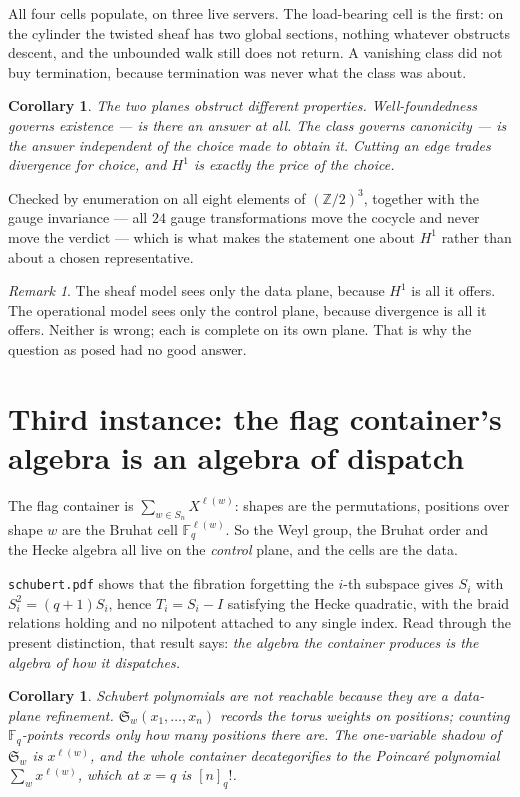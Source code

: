 \documentclass[11pt,a4paper]{article}
\newtheorem{corollary}[theorem]{Corollary}
\theoremstyle{definition}
\theoremstyle{remark}
\newtheorem{remark}[theorem]{Remark}
\newcommand{\FF}{\mathbb{F}}
\newcommand{\ZZ}{\mathbb{Z}}
\newcommand{\Schub}{\mathfrak{S}}
\begin{document}
All four cells populate, on three live servers. The load-bearing cell is the
first: on the cylinder the twisted sheaf has two global sections, nothing
whatever obstructs descent, and the unbounded walk still does not return. A
vanishing class did not buy termination, because termination was never what the
class was about.

\begin{corollary}
The two planes obstruct different properties. Well-foundedness governs
\emph{existence} --- is there an answer at all. The class governs
\emph{canonicity} --- is the answer independent of the choice made to obtain it.
Cutting an edge trades divergence for choice, and $H^1$ is exactly the price of
the choice.
\end{corollary}

Checked by enumeration on all eight elements of $(\ZZ/2)^3$, together with the
gauge invariance --- all $24$ gauge transformations move the cocycle and never
move the verdict --- which is what makes the statement one about $H^1$ rather
than about a chosen representative.

\begin{remark}
The sheaf model sees only the data plane, because $H^1$ is all it offers. The
operational model sees only the control plane, because divergence is all it
offers. Neither is wrong; each is complete on its own plane. That is why the
question as posed had no good answer.
\end{remark}

\section{Third instance: the flag container's algebra is an algebra of dispatch}

The flag container is $\sum_{w \in S_n} X^{\ell(w)}$: shapes are the permutations,
positions over shape $w$ are the Bruhat cell $\FF_q^{\ell(w)}$. So the Weyl group,
the Bruhat order and the Hecke algebra all live on the \emph{control} plane, and
the cells are the data.

\texttt{schubert.pdf} shows that the fibration forgetting the $i$-th subspace
gives $S_i$ with $S_i^2 = (q+1)S_i$, hence $T_i = S_i - I$ satisfying the Hecke
quadratic, with the braid relations holding and no nilpotent attached to any
single index. Read through the present distinction, that result says: \emph{the
algebra the container produces is the algebra of how it dispatches.}

\begin{corollary}
Schubert polynomials are not reachable because they are a data-plane refinement.
$\Schub_w(x_1, \ldots, x_n)$ records the torus weights on positions; counting
$\FF_q$-points records only how many positions there are. The one-variable shadow
of $\Schub_w$ is $x^{\ell(w)}$, and the whole container decategorifies to the
Poincar\'e polynomial $\sum_w x^{\ell(w)}$, which at $x = q$ is $[n]_q!$.
\end{corollary}
\end{document}
